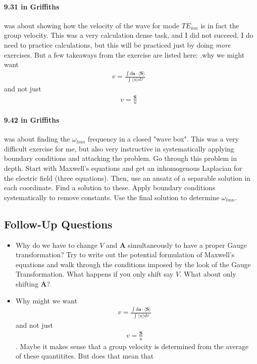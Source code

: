 \paragraph{9.31 in Griffiths} was about showing how the velocity of the wave for mode \(TE_{mn}\) is in fact the group velocity. This was a very calculation dense task, and I did not succeed. I do need to practice calculations, but this will be practiced just by doing \textit{more} exercises. But a few takeaways from the exercise are listed here: .why we might want \begin{align*}
    v = \frac{\int d \mathbf{a} \cdot \langle \mathbf{S} \rangle }{\int \langle u \rangle d \tau}
\end{align*}
and not just \begin{align*}
    v = \frac{\mathbf{S}}{u}
\end{align*}

\paragraph{9.42 in Griffiths} was about finding the \(\omega_{lmn}\) frequency in a closed "wave box". This was a very difficult exercise for me, but also very instructive in systematically applying boundary conditions and attacking the problem. Go through this problem in depth. Start with Maxwell's equations and get an inhomogenous Laplacian for the electric field (three equations). Then, use an ansatz of a separable solution in each coordinate. Find a solution to these. Apply boundary conditions systematically to remove constants. Use the final solution to determine \(\omega_{lmn} \).  

\subsection*{Follow-Up Questions}
\begin{itemize}
    \item Why do we have to change \(V\) and \(\mathbf{A}\) simultaneously to have a proper Gauge transformation? Try to write out the potential formulation of Maxwell's equations and walk through the conditions imposed by the look of the Gauge Transformation. What happens if you only shift say \(V\). What about only shifting \(\mathbf{A}\)? 
    \item Why might we want \begin{align*}
        v = \frac{\int d \mathbf{a} \cdot \langle \mathbf{S} \rangle }{\int \langle u \rangle d \tau}
    \end{align*}
    and not just \begin{align*}
        v = \frac{\mathbf{S}}{u}
    \end{align*}. Maybe it makes sense that a group velocity is determined from the average of these quantitites. But does that mean that 
\end{itemize}
